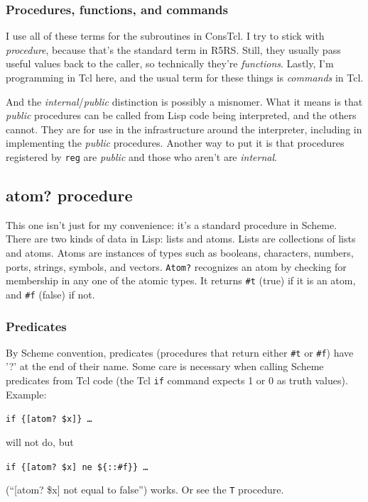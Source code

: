 \documentclass[twoside]{report}
\begin{document}
\begin{pulledtext}

\subsubsection{Procedures, functions, and commands}
\label{procedures-functions-and-commands}

I use all of these terms for the subroutines in ConsTcl. I try to stick with \emph{procedure}, because that's the standard term in R5RS. Still, they usually pass useful values back to the caller, so technically they're \emph{functions}. Lastly, I'm programming in Tcl here, and the usual term for these things is \emph{commands} in Tcl.

And the \emph{internal}/\emph{public} distinction is possibly a misnomer. What it means is that \emph{public} procedures can be called from Lisp code being interpreted, and the others cannot. They are for use in the infrastructure around the interpreter, including in implementing the \emph{public} procedures. Another way to put it is that procedures registered by \texttt{reg} are \emph{public} and those who aren't are \emph{internal}.
\end{pulledtext}

\subsection{atom? procedure}
\label{atom-procedure}

This one isn't just for my convenience: it's a standard procedure in Scheme. There are two kinds of data in Lisp: lists and atoms. Lists are collections of lists and atoms. Atoms are instances of types such as booleans, characters, numbers, ports, strings, symbols, and vectors. \texttt{Atom?} recognizes an atom by checking for membership in any one of the atomic types. It returns \texttt{\#t} (true) if it is an atom, and \texttt{\#f} (false) if not.

\begin{pulledtext}

\subsubsection{Predicates}
\label{predicates}

By Scheme convention, predicates (procedures that return either \texttt{\#t} or \texttt{\#f}) have '?' at the end of their name. Some care is necessary when calling Scheme predicates from Tcl code (the Tcl \texttt{if} command expects 1 or 0 as truth values). Example:

\texttt{if \{[atom? \$x]\} \ldots }

will not do, but

\texttt{if \{[atom? \$x] ne \$\{::\#f\}\} \ldots }

(``[atom? \$x] not equal to false'') works. Or see the \texttt{T} procedure.
\end{pulledtext}
\end{document}
